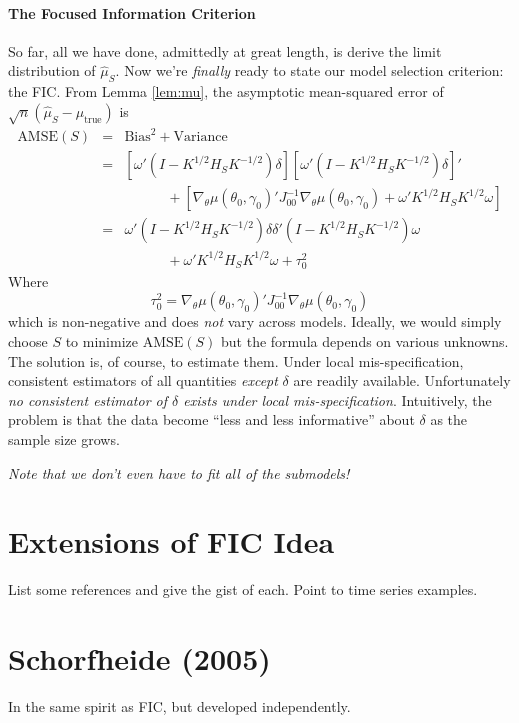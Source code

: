 \documentclass[12pt]{article}
\theoremstyle{definition}
\begin{document}
\paragraph{The Focused Information Criterion} So far, all we have done, admittedly at great length, is derive the limit distribution of $\widehat{\mu}_S$. Now we're \emph{finally} ready to state our model selection criterion: the FIC. From Lemma \ref{lem:mu}, the asymptotic mean-squared error of $\sqrt{n}\left(\widehat{\mu}_S - \mu_{\mbox{true}} \right)$ is
	\begin{eqnarray*}
		\mbox{AMSE}(S) &=& \mbox{Bias}^2 + \mbox{Variance}\\
		&=&\left[\omega'(I - K^{1/2}H_SK^{-1/2})\delta \right] \left[\omega'(I - K^{1/2}H_SK^{-1/2})\delta \right]'\\
			&& \quad \quad \quad + \left[\nabla_\theta \mu(\theta_0, \gamma_0)'J_{00}^{-1}\nabla_\theta \mu(\theta_0, \gamma_0) + \omega'K^{1/2}H_S K^{1/2}\omega \right]\\
		&=& \omega' (I - K^{1/2}H_SK^{-1/2})\delta \delta'(I - K^{1/2}H_SK^{-1/2})\omega \\
		&& \quad \quad \quad + \omega'K^{1/2}H_S K^{1/2}\omega  + \tau_0^2
	\end{eqnarray*}
Where 
	$$\tau_0^2 = \nabla_\theta \mu(\theta_0, \gamma_0)'J_{00}^{-1}\nabla_\theta \mu(\theta_0, \gamma_0)$$
which is non-negative and does \emph{not} vary across models. Ideally, we would simply choose $S$ to minimize $\mbox{AMSE}(S)$ but the formula depends on various unknowns. The solution is, of course, to estimate them. Under local mis-specification, consistent estimators of all quantities \emph{except} $\delta$ are readily available. Unfortunately \emph{no consistent estimator of $\delta$ exists under local mis-specification}. Intuitively, the problem is that the data become ``less and less informative'' about $\delta$ as the sample size grows.

\emph{Note that we don't even have to fit all of the submodels!}


\section{Extensions of FIC Idea}
List some references and give the gist of each. Point to time series examples.

\section{Schorfheide (2005)}
In the same spirit as FIC, but developed independently.
\end{document}
